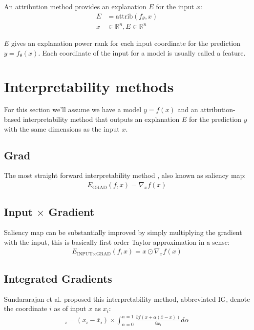 \documentclass[12pt]{report}
\begin{document}
An attribution method provides an explanation $E$ for the input $x$:
\begin{align*}
	E &= \text{attrib}(f_{\theta}, x) \\
	x & \in \mathbb{R}^n, E \in \mathbb{R}^n
\end{align*}

$E$ gives an explanation power rank for each input coordinate for the prediction $y=f_{\theta}(x)$. Each coordinate of the input for a model is usually called a feature. 



\newpage
\section{Interpretability methods}

For this section we'll assume we have a model $y=f(x)$ and an attribution-based interpretability  method that outputs an explanation $E$ for the prediction $y$ with the same dimensions as the input $x$.

\subsection{Grad}
	The most straight forward interpretability method \cite{baehrens2010explain} \cite{https://doi.org/10.48550/arxiv.1312.6034}, also known as saliency map:
\begin{align*}
	E_\text{GRAD}(f, x)  = \nabla_{x}f(x)
\end{align*}


\subsection{Input $\times$ Gradient}
Saliency map can be substantially improved \cite{DBLP:journals/corr/ShrikumarGSK16} by simply multiplying the gradient with the input, this is basically first-order Taylor approximation in a sense:
\begin{align*}
	E_{\text{INPUT} \times \text{GRAD}}(f, x)  = x \odot \nabla_{x}f(x)
\end{align*}


\subsection{Integrated Gradients}
Sundararajan et al. \cite{DBLP:journals/corr/SundararajanTY17} proposed this interpretability method, abbreviated IG, denote the coordinate $i$ as of input $x$ as $x_i$: 
\begin{align*}
	[E_\text{IG}(f, x)]_i  = (x_i - \overline{x}_i) \times \int_{\alpha=0}^{\alpha=1}\frac{\partial f(x+ \alpha(\overline{x}-x ))}{\partial x_i} d \alpha
\end{align*}
\end{document}
